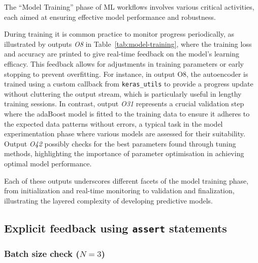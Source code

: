 The ``Model Training'' phase of ML workflows involves various critical activities, each aimed at ensuring effective model performance and robustness.

During training it is common practice to monitor progress periodically, as illustrated by outputs \emph{O8} in Table~\ref{tab:model-training}, where the training loss and accuracy are printed to give real-time feedback on the model's learning efficacy. This feedback allows for adjustments in training parameters or early stopping to prevent overfitting. For instance, in output O8, the autoencoder is trained using a custom callback from \texttt{keras\_utils} to provide a progress update without cluttering the output stream, which is particularly useful in lengthy training sessions. In contrast, output \emph{O31} represents a crucial validation step where the adaBoost model is fitted to the training data to ensure it adheres to the expected data patterns without errors, a typical task in the model experimentation phase where various models are assessed for their suitability. Output \emph{O42} possibly checks for the best parameters found through tuning methods, highlighting the importance of parameter optimisation in achieving optimal model performance.

Each of these outputs underscores different facets of the model training phase, from initialization and real-time monitoring to validation and finalization, illustrating the layered complexity of developing predictive models.

\subsection{Explicit feedback using \texttt{assert} statements}


\subsubsection{Batch size check ($N = 3$)}

